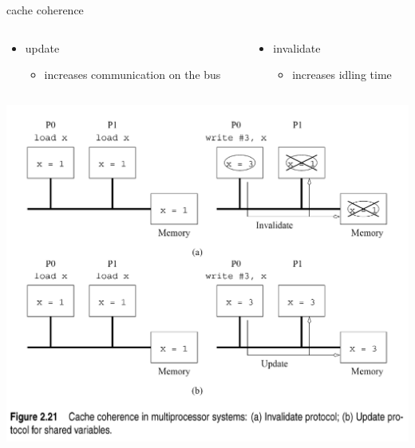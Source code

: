 \documentclass[10pt, t]{beamer}
\begin{document}
  \begin{frame}{cache coherence}
      \begin{columns}
        \begin{column}{.52\textwidth}
          \begin{itemize}
            \item update
              \begin{itemize}
                \item increases communication on the bus
              \end{itemize}
          \end{itemize}
        \end{column}
        \begin{column}{.44\textwidth}
          \begin{itemize}
          \item invalidate
            \begin{itemize}
              \item increases idling time
            \end{itemize}
        \end{itemize}
      \end{column}
    \end{columns}

    \centering
    \includegraphics[width=.60\textwidth]{cc_protocols.pdf}\\
    \hfill \tiny{\href{}{}}


\end{frame}
\end{document}
